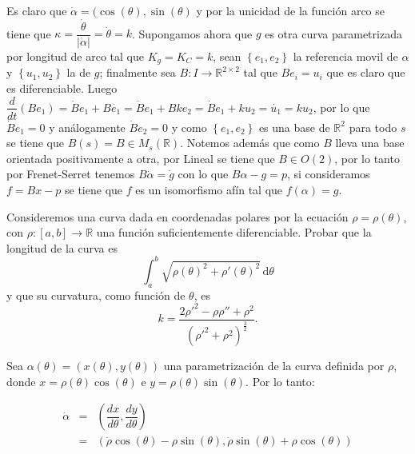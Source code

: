 \documentclass[11pt]{article}
\newcommand{\R}{{\mathbb{R}}}
\newcommand\dd{\,\mathrm{d}}
\newcommand\abs[1]{\left\lvert#1\right\rvert}
\newcommand{\sett}[1]{\left\lbrace#1\right\rbrace}
\newenvironment{proof}[1][Demostraci\'on]{\begin{trivlist}
		\item[\hskip \labelsep {\bfseries #1}]}{\end{trivlist}}
\newcommand{\qed}{\nobreak \ifvmode \relax \else
	\ifdim\lastskip<1.5em \hskip-\lastskip
	\hskip1.5em plus0em minus0.5em \fi \nobreak
	\vrule height0.75em width0.5em depth0.25em\fi}
\begin{document}
\begin{enumerate}
	\label{Ejercicio 11}
	
	\begin{proof}
		
		Es claro que $\dot{\alpha} = (\cos(\theta), \sin(\theta)$ y por la unicidad de la funci\'on arco se tiene que $\kappa = \dfrac{\dot{\theta}}{\abs{\dot{\alpha}}} = \dot{\theta} = k$. Supongamos ahora que $g$ es otra curva parametrizada por longitud de arco tal que $K_g = K_C = k$, sean $\sett{e_1,e_2}$ la referencia movil de $\alpha$ y $\sett{u_1,u_2}$ la de $g$; finalmente sea $B :I \rightarrow \R^{2 \times 2}$ tal que $B e_i = u_i$ que es claro que es diferenciable. Luego $\dfrac{d}{dt}(B e_1) = \dot{B}e_1 + B \dot{e_1} = \dot{B}e_1 + B k e_2 = \dot{B}e_1 + k u_2 = \dot{u_1} = k u_2$, por lo que $\dot{B}e_1 = 0$ y an\'alogamente $\dot{B}e_2 = 0$ y como $\sett{e_1,e_2}$ es una base de $\R^2$ para todo $s$ se tiene que $B(s) = B \in M_s(\R)$. Notemos adem\'as que como $B$ lleva una base orientada positivamente a otra, por Lineal se tiene que $B \in O(2)$, por lo tanto por Frenet-Serret tenemos $B \dot{\alpha} = \dot{g}$ con lo que $B \alpha - g = p$, si consideramos $f = Bx - p$ se tiene que $f$ es un isomorfismo af\'in tal que $f(\alpha) = g$. \qed
		
	\end{proof}
	
	\item Consideremos una curva dada en coordenadas polares por la ecuaci\'on $\rho =\rho
	(\theta )$, con $\rho:[a,b]\to\R$ una funci\'on suficientemente
	diferenciable. Probar que la longitud de la curva es
	\[
	\int_a^b\sqrt{\rho(\theta)^2+\rho'(\theta)^2}\dd\theta
	\]
	y que su curvatura, como funci\'on de $\theta$, es
	\[
	k=\frac{2\rho'^2-\rho\rho''+\rho ^2}{(\rho'^2+\rho^2)^{\frac 32}}.
	\]

	\label{Eercicio 12}
	
	\begin{proof}
		
		Sea $\alpha(\theta) = (x(\theta), y(\theta))$ una parametrizaci\'on de la curva definida por $\rho$, donde $x = \rho(\theta)\cos(\theta)$ e $y = \rho(\theta)\sin(\theta)$. Por lo tanto:
		
		\[
		\begin{array}{ccc}
		\dot{\alpha} & = & (\dfrac{dx}{d\theta}, \dfrac{dy}{d\theta}) \\ 
		& = & (\dot{\rho}\cos(\theta) - \rho\sin(\theta) , \dot{\rho}\sin(\theta) + \rho\cos(\theta) ) 
		\end{array} 		
		\]
		

\end{proof}
\end{enumerate}
\end{document}
